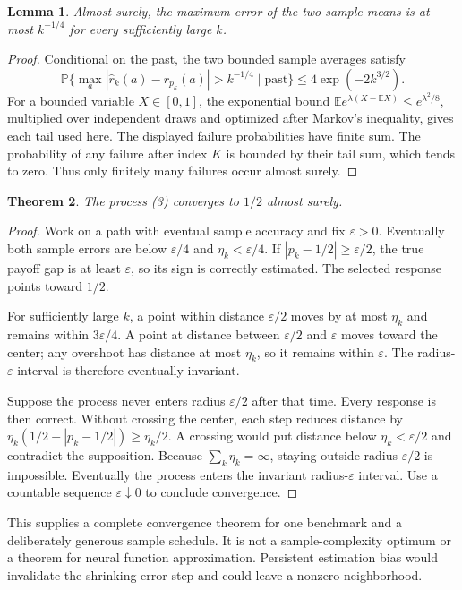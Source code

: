 \documentclass[11pt,a4paper]{article}
\newtheorem{theorem}{Theorem}[section]
\newtheorem{lemma}[theorem]{Lemma}
\newcommand{\E}{\mathbb E}
\newcommand{\Prob}{\mathbb P}
\begin{document}
\begin{lemma}
Almost surely, the maximum error of the two sample means is at most $k^{-1/4}$ for every sufficiently large $k$.
\end{lemma}
\begin{proof}
Conditional on the past, the two bounded sample averages satisfy
\[
 \Prob\{\max_a|\widehat r_k(a)-r_{p_k}(a)|>k^{-1/4}
             \mid\text{past}\}
 \le4\exp(-2k^{3/2}).
\]
For a bounded variable $X\in[0,1]$, the exponential bound
$\E e^{\lambda(X-\E X)}\le e^{\lambda^2/8}$, multiplied over independent draws and optimized after Markov's inequality, gives each tail used here. The displayed failure probabilities have finite sum. The probability of any failure after index $K$ is bounded by their tail sum, which tends to zero. Thus only finitely many failures occur almost surely.
\end{proof}
\begin{theorem}
The process (3) converges to $1/2$ almost surely.
\end{theorem}
\begin{proof}
Work on a path with eventual sample accuracy and fix $\varepsilon>0$. Eventually both sample errors are below $\varepsilon/4$ and $\eta_k<\varepsilon/4$. If $|p_k-1/2|\ge\varepsilon/2$, the true payoff gap is at least $\varepsilon$, so its sign is correctly estimated. The selected response points toward $1/2$.

For sufficiently large $k$, a point within distance $\varepsilon/2$ moves by at most $\eta_k$ and remains within $3\varepsilon/4$. A point at distance between $\varepsilon/2$ and $\varepsilon$ moves toward the center; any overshoot has distance at most $\eta_k$, so it remains within $\varepsilon$. The radius-$\varepsilon$ interval is therefore eventually invariant.

Suppose the process never enters radius $\varepsilon/2$ after that time. Every response is then correct. Without crossing the center, each step reduces distance by
$\eta_k(1/2+|p_k-1/2|)\ge\eta_k/2$. A crossing would put distance below $\eta_k<\varepsilon/2$ and contradict the supposition. Because $\sum_k\eta_k=\infty$, staying outside radius $\varepsilon/2$ is impossible. Eventually the process enters the invariant radius-$\varepsilon$ interval. Use a countable sequence $\varepsilon\downarrow0$ to conclude convergence.
\end{proof}
This supplies a complete convergence theorem for one benchmark and a deliberately generous sample schedule. It is not a sample-complexity optimum or a theorem for neural function approximation. Persistent estimation bias would invalidate the shrinking-error step and could leave a nonzero neighborhood.
\end{document}

